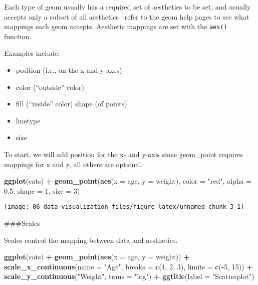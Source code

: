 \documentclass[11pt,]{article}
\newenvironment{Shaded}{\begin{snugshade}}{\end{snugshade}}
\newcommand{\DataTypeTok}[1]{\textcolor[rgb]{0.13,0.29,0.53}{#1}}
\newcommand{\DecValTok}[1]{\textcolor[rgb]{0.00,0.00,0.81}{#1}}
\newcommand{\FloatTok}[1]{\textcolor[rgb]{0.00,0.00,0.81}{#1}}
\newcommand{\KeywordTok}[1]{\textcolor[rgb]{0.13,0.29,0.53}{\textbf{#1}}}
\newcommand{\NormalTok}[1]{#1}
\newcommand{\OperatorTok}[1]{\textcolor[rgb]{0.81,0.36,0.00}{\textbf{#1}}}
\newcommand{\StringTok}[1]{\textcolor[rgb]{0.31,0.60,0.02}{#1}}
\providecommand{\tightlist}{%
  \setlength{\itemsep}{0pt}\setlength{\parskip}{0pt}}
\begin{document}
Each type of geom usually has a required set of aesthetics to be set,
and usually accepts only a subset of all aesthetics --refer to the geom
help pages to see what mappings each geom accepts. Aesthetic mappings
are set with the \texttt{aes()} function.

Examples include:

\begin{itemize}
\tightlist
\item
  position (i.e., on the x and y axes)
\item
  color (``outside'' color)
\item
  fill (``inside'' color) shape (of points)
\item
  linetype
\item
  size
\end{itemize}

To start, we will add position for the x- and y-axis since geom\_point
requires mappings for x and y, all others are optional.

\begin{Shaded}
\begin{Highlighting}[]
\KeywordTok{ggplot}\NormalTok{(cats) }\OperatorTok{+}
\StringTok{    }\KeywordTok{geom_point}\NormalTok{(}\KeywordTok{aes}\NormalTok{(}\DataTypeTok{x =}\NormalTok{ age, }\DataTypeTok{y =}\NormalTok{ weight),}
               \DataTypeTok{color =} \StringTok{"red"}\NormalTok{,}
               \DataTypeTok{alpha =} \FloatTok{0.5}\NormalTok{,}
               \DataTypeTok{shape =} \DecValTok{1}\NormalTok{,}
               \DataTypeTok{size =} \DecValTok{3}\NormalTok{)}
\end{Highlighting}
\end{Shaded}

\begin{center}\texttt{[image: 06-data-visualization\_files/figure-latex/unnamed-chunk-3-1]} \end{center}

\#\#\#Scales

Scales control the mapping between data and aesthetics.

\begin{Shaded}
\begin{Highlighting}[]
\KeywordTok{ggplot}\NormalTok{(cats) }\OperatorTok{+}
\StringTok{    }\KeywordTok{geom_point}\NormalTok{(}\KeywordTok{aes}\NormalTok{(}\DataTypeTok{x =}\NormalTok{ age, }\DataTypeTok{y =}\NormalTok{ weight)) }\OperatorTok{+}
\StringTok{    }\KeywordTok{scale_x_continuous}\NormalTok{(}\DataTypeTok{name =} \StringTok{"Age"}\NormalTok{,}
                       \DataTypeTok{breaks =} \KeywordTok{c}\NormalTok{(}\DecValTok{1}\NormalTok{, }\DecValTok{2}\NormalTok{, }\DecValTok{3}\NormalTok{),}
                       \DataTypeTok{limits =} \KeywordTok{c}\NormalTok{(}\OperatorTok{-}\DecValTok{5}\NormalTok{, }\DecValTok{15}\NormalTok{)) }\OperatorTok{+}
\StringTok{    }\KeywordTok{scale_y_continuous}\NormalTok{(}\StringTok{"Weight"}\NormalTok{, }\DataTypeTok{trans =} \StringTok{"log"}\NormalTok{) }\OperatorTok{+}\StringTok{ }
\StringTok{    }\KeywordTok{ggtitle}\NormalTok{(}\DataTypeTok{label =} \StringTok{"Scatterplot"}\NormalTok{)}
\end{Highlighting}
\end{Shaded}
\end{document}
